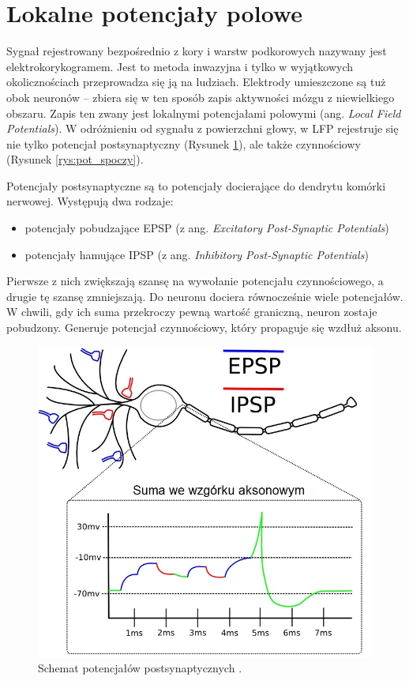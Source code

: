 \documentclass{pracamgr_2}
\begin{document}
\section{Lokalne potencjały polowe}
Sygnał rejestrowany bezpośrednio z kory i warstw podkorowych nazywany jest elektrokorykogramem. Jest to metoda inwazyjna i tylko w  wyjątkowych okolicznościach przeprowadza się ją na ludziach. Elektrody umieszczone są tuż obok neuronów -- zbiera się w ten sposób zapis aktywności mózgu z niewielkiego obszaru. Zapis ten zwany jest lokalnymi potencjałami polowymi (ang. \textit{Local Field Potentials}). W odróżnieniu od sygnału z powierzchni głowy, w LFP rejestruje się nie tylko potencjał postsynaptyczny (Rysunek \ref{rys:epsp}), ale także czynnościowy (Rysunek \ref{rys:pot_spoczy}).

Potencjały postsynaptyczne są to potencjały docierające do dendrytu komórki nerwowej. Występują dwa rodzaje:
\begin{itemize}
	\item potencjały pobudzające EPSP (z ang. \textit{Excitatory Post-Synaptic Potentials})
	\item potencjały hamujące IPSP (z ang. \textit{Inhibitory Post-Synaptic Potentials}) 
\end{itemize}
Pierwsze z nich zwiększają szansę na wywołanie potencjału czynnościowego, a drugie tę szansę zmniejszają. Do neuronu dociera równocześnie wiele potencjałów. W chwili, gdy ich suma przekroczy pewną wartość graniczną, neuron zostaje pobudzony. Generuje potencjał czynnościowy, który propaguje się wzdłuż aksonu.
\begin{figure}[htbp]
	\begin{center}
		\includegraphics[scale=0.5]{epsp.jpg}
	\end{center}
	\caption{Schemat potencjałów postsynaptycznych \citep{versace}.}
	\label{rys:epsp}
\end{figure}
\end{document}
